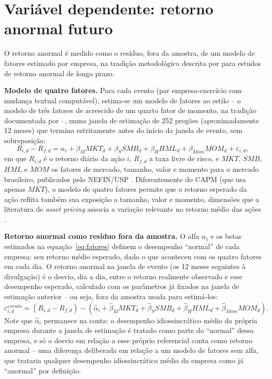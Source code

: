 \documentclass[a4paper,12pt]{report}
\begin{document}
\section{Variável dependente: retorno anormal futuro}
\label{sec:var_dependente}

O retorno anormal é medido como o resíduo, fora da amostra, de um modelo de fatores estimado por empresa, na tradição metodológica descrita por  para estudos de retorno anormal de longo prazo.

\textbf{Modelo de quatro fatores.} Para cada evento (par empresa-exercício com mudança textual computável), estima-se um modelo de fatores ao estilo  -- o modelo de três fatores de  acrescido de um quarto fator de momento, na tradição documentada por  --, numa janela de estimação de 252 pregões (aproximadamente 12 meses) que termina estritamente antes do início da janela de evento, sem sobreposição:
\begin{equation}
    R_{i,d} - R_{f,d} = \alpha_i + \beta_M \mathit{MKT}_d + \beta_S \mathit{SMB}_d + \beta_H \mathit{HML}_d + \beta_{Mom} \mathit{MOM}_d + \varepsilon_{i,d},
    \label{eq:fatores}
\end{equation}
em que $R_{i,d}$ é o retorno diário da ação $i$, $R_{f,d}$ a taxa livre de risco, e $\mathit{MKT}$, $\mathit{SMB}$, $\mathit{HML}$ e $\mathit{MOM}$ os fatores de mercado, tamanho, valor e momento para o mercado brasileiro, publicados pelo NEFIN/USP \cite{nefin2026}. Diferentemente do CAPM (que usa apenas $\mathit{MKT}$), o modelo de quatro fatores permite que o retorno esperado da ação reflita também sua exposição a tamanho, valor e momento, dimensões que a literatura de \textit{asset pricing} associa a variação relevante no retorno médio das ações \cite{famafrench1992}.

\textbf{Retorno anormal como resíduo fora da amostra.} O alfa $\alpha_i$ e os betas estimados na equação~\ref{eq:fatores} definem o desempenho ``normal'' de cada empresa: seu retorno médio esperado, dado o que aconteceu com os quatro fatores em cada dia. O retorno anormal na janela de evento (os 12 meses seguintes à divulgação) é o desvio, dia a dia, entre o retorno realmente observado e esse desempenho esperado, calculado com os parâmetros já fixados na janela de estimação anterior -- ou seja, fora da amostra usada para estimá-los:
\begin{equation}
    \varepsilon_{i,d}^{evento} = \left(R_{i,d} - R_{f,d}\right) - \left(\hat\alpha_i + \hat\beta_M \mathit{MKT}_d + \hat\beta_S \mathit{SMB}_d + \hat\beta_H \mathit{HML}_d + \hat\beta_{Mom} \mathit{MOM}_d\right).
    \label{eq:residuo_evento}
\end{equation}
Note que $\hat\alpha_i$ permanece na conta: o desempenho idiossincrático médio da própria empresa durante a janela de estimação é tratado como parte do ``normal'' dessa empresa, e só o desvio em relação a esse próprio referencial conta como retorno anormal -- uma diferença deliberada em relação a um modelo de fatores sem alfa, que trataria qualquer desempenho idiossincrático médio da empresa como já ``anormal'' por definição.
\end{document}
